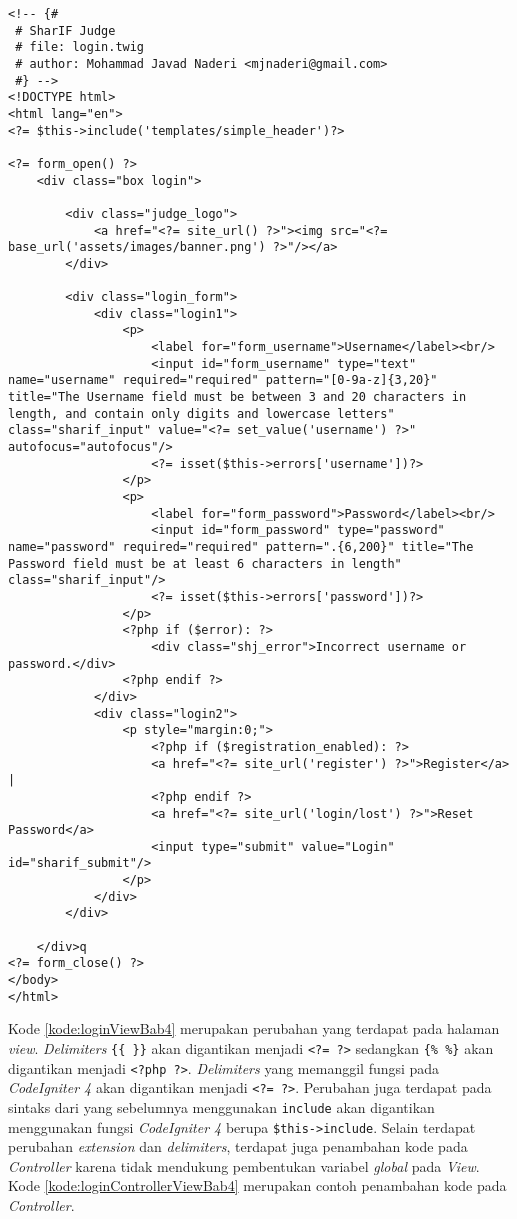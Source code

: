 \begin{lstlisting}[caption=Perubahan \textit{view} pada \textit{Login.php}, label=kode:loginViewBab4]
<!-- {#
 # SharIF Judge
 # file: login.twig
 # author: Mohammad Javad Naderi <mjnaderi@gmail.com>
 #} -->
<!DOCTYPE html>
<html lang="en">
<?= $this->include('templates/simple_header')?>

<?= form_open() ?>
	<div class="box login">

		<div class="judge_logo">
			<a href="<?= site_url() ?>"><img src="<?= base_url('assets/images/banner.png') ?>"/></a>
		</div>

		<div class="login_form">
			<div class="login1">
				<p>
					<label for="form_username">Username</label><br/>
					<input id="form_username" type="text" name="username" required="required" pattern="[0-9a-z]{3,20}" title="The Username field must be between 3 and 20 characters in length, and contain only digits and lowercase letters" class="sharif_input" value="<?= set_value('username') ?>" autofocus="autofocus"/>
					<?= isset($this->errors['username'])?>
				</p>
				<p>
					<label for="form_password">Password</label><br/>
					<input id="form_password" type="password" name="password" required="required" pattern=".{6,200}" title="The Password field must be at least 6 characters in length" class="sharif_input"/>
					<?= isset($this->errors['password'])?>
				</p>
				<?php if ($error): ?>
					<div class="shj_error">Incorrect username or password.</div>
				<?php endif ?>
			</div>
			<div class="login2">
				<p style="margin:0;">
					<?php if ($registration_enabled): ?>
					<a href="<?= site_url('register') ?>">Register</a> |
					<?php endif ?>
					<a href="<?= site_url('login/lost') ?>">Reset Password</a>
					<input type="submit" value="Login" id="sharif_submit"/>
				</p>
			</div>
		</div>

	</div>q
<?= form_close() ?>
</body>
</html>
\end{lstlisting}

Kode \ref{kode:loginViewBab4} merupakan perubahan yang terdapat pada halaman \textit{view}. \textit{Delimiters} \verb|{{ }}| akan digantikan menjadi \texttt{<?= ?>} sedangkan \verb|{% %}| akan digantikan menjadi \texttt{<?php ?>}. \textit{Delimiters} yang memanggil fungsi pada \textit{CodeIgniter 4} akan digantikan menjadi \texttt{<?= ?>}. Perubahan juga terdapat pada sintaks dari yang sebelumnya menggunakan \texttt{include} akan digantikan menggunakan fungsi \textit{CodeIgniter 4} berupa \verb|$this->include|. Selain terdapat perubahan \textit{extension} dan \textit{delimiters}, terdapat juga penambahan kode pada \textit{Controller} karena tidak mendukung pembentukan variabel \textit{global} pada \textit{View}. Kode \ref{kode:loginControllerViewBab4} merupakan contoh penambahan kode pada \textit{Controller}.

